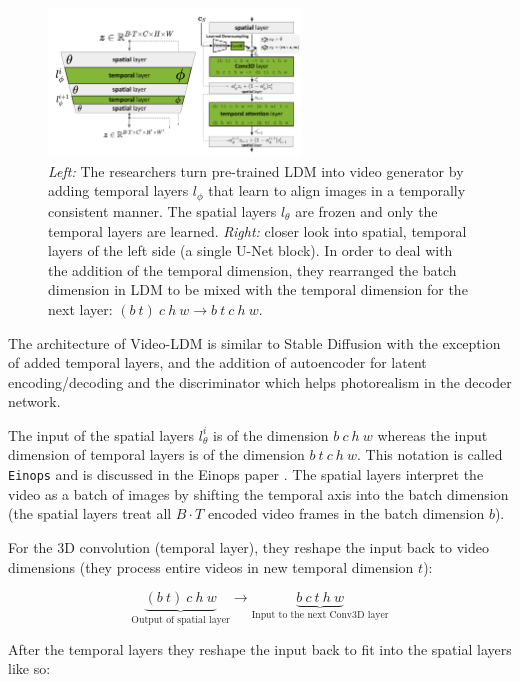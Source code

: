 \begin{figure}
    \centering
    \includegraphics[width=0.6\textwidth]{images/video_ldm/temporal_layers.png}
    \caption{\textit{Left:} The researchers turn pre-trained LDM into video generator by adding temporal layers $l_\phi$ that learn to align images in a temporally consistent manner. The spatial layers $l_\theta$ are frozen and only the temporal layers are learned. \textit{Right:} closer look into spatial, temporal layers of the left side (a single U-Net block). In order to deal with the addition of the temporal dimension, they rearranged the batch dimension in LDM to be mixed with the temporal dimension for the next layer: $(b\ t)\ c\ h\ w \rightarrow b\ t\ c\ h\ w$.}
    \label{fig:video_ldm_spatial_temporal_mixing_layers}
\end{figure}

The architecture of Video-LDM is similar to Stable Diffusion with the exception of added temporal layers, and the addition of autoencoder for latent encoding/decoding and the discriminator which helps photorealism in the decoder network.

The input of the spatial layers $l_\theta^i$ is of the dimension $b\ c\ h\ w$ whereas the input dimension of temporal layers is of the dimension $b\ t\ c\ h\ w$. This notation is called \texttt{Einops} and is discussed in the Einops paper \cite{einops}. The spatial layers interpret the video as a batch of images by shifting the temporal axis into the batch dimension (the spatial layers treat all $B \cdot T$ encoded video frames in the batch dimension $b$). 

For the 3D convolution (temporal layer), they reshape the input back to video dimensions (they process entire videos in new temporal dimension $t$): 

\[ \underbrace{(b\ t)\ c\ h\ w}_{\text{Output of spatial layer}} \rightarrow \underbrace{b\ c\ t\ h\ w}_{\text{Input to the next Conv3D layer}} \]

After the temporal layers they reshape the input back to fit into the spatial layers like so:

